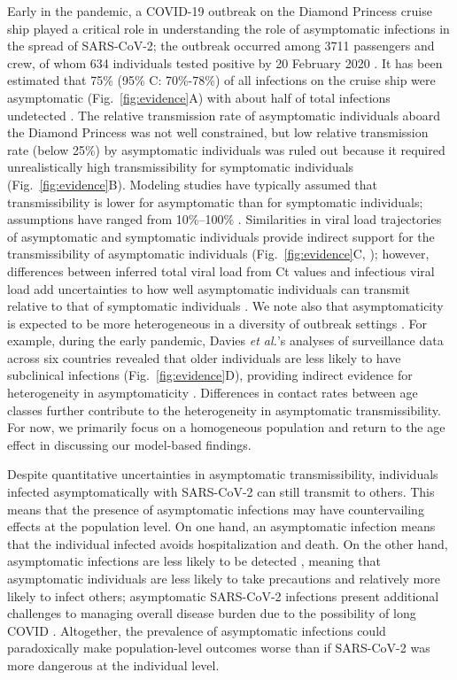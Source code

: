 \documentclass[12pt]{article}
\newcommand{\fref}[1]{Fig.~\ref{fig:#1}}
\begin{document}
Early in the pandemic, a COVID-19 outbreak on the Diamond Princess cruise ship played a critical role in understanding the role of asymptomatic infections in the spread of SARS-CoV-2;
the outbreak occurred among 3711 passengers and crew, of whom 634 individuals tested positive by 20 February 2020 \citep{mizumoto2020estimating}.
It has been estimated that 75\% (95\% C: 70\%-78\%) of all infections on the cruise ship were asymptomatic (\fref{evidence}A) with about half of total infections undetected \citep{emery2020}.
The relative transmission rate of asymptomatic individuals aboard the Diamond Princess was not well constrained, but low relative transmission rate (below 25\%) by asymptomatic individuals was ruled out because it required unrealistically high transmissibility for symptomatic individuals (\fref{evidence}B).
Modeling studies have typically assumed that transmissibility is lower for asymptomatic than for symptomatic individuals; assumptions have ranged from 10\%--100\% \citep{ferretti2020quantifying,lavezzo2020}.
Similarities in viral load trajectories of asymptomatic and symptomatic individuals provide indirect support for the transmissibility of asymptomatic individuals (\fref{evidence}C, \citep{Kissler2020}); 
however, differences between inferred total viral load from Ct values and infectious viral load add uncertainties to how well asymptomatic individuals can transmit relative to that of symptomatic individuals \citep{romero2021ct}.
We note also that asymptomaticity is expected to be more heterogeneous in a diversity of outbreak settings \citep{alene2021magnitude}.
For example, during the early pandemic, Davies \textit{et al.}'s analyses of surveillance data across six countries revealed that older individuals are less likely to have subclinical infections (\fref{evidence}D), providing indirect evidence for heterogeneity in asymptomaticity \cite{davies2020}.
Differences in contact rates between age classes further contribute to the heterogeneity in asymptomatic transmissibility.
For now, we primarily focus on a homogeneous population and return to the age effect in discussing our model-based findings.

Despite quantitative uncertainties in asymptomatic transmissibility, individuals infected asymptomatically with SARS-CoV-2 can still transmit to others. 
This means that the presence of asymptomatic infections may have countervailing effects at the population level. 
On one hand, an asymptomatic infection means that the individual infected avoids hospitalization and death. 
On the other hand, asymptomatic infections are less likely to be detected \citep{fraser2004factors}, meaning that asymptomatic individuals are less likely to take precautions and relatively more likely to infect others;
asymptomatic SARS-CoV-2 infections present additional challenges to managing overall disease burden due to the possibility of long COVID \citep{xie2022long}.
Altogether, the prevalence of asymptomatic infections could paradoxically make population-level outcomes worse than if SARS-CoV-2 was more dangerous at the individual level.
\end{document}
